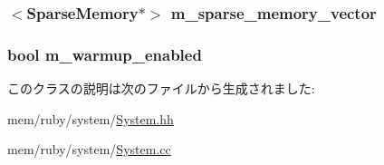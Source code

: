 \label{classRubySystem_aa846ca9467116a26a879dc4b262cf36a}
\hypertarget{classRubySystem_a808eab8032db5c7032a0b805fbb77351}{
\subsubsection[{m\_\-sparse\_\-memory\_\-vector}]{$<${\bf SparseMemory}$\ast$$>$ {\bf m\_\-sparse\_\-memory\_\-vector}}}
\label{classRubySystem_a808eab8032db5c7032a0b805fbb77351}
\hypertarget{classRubySystem_ae9051ba7e9770f4a2be7a20f6f185e86}{
\subsubsection[{m\_\-warmup\_\-enabled}]{\setlength{\rightskip}{0pt plus 5cm}bool {\bf m\_\-warmup\_\-enabled}}}
\label{classRubySystem_ae9051ba7e9770f4a2be7a20f6f185e86}


このクラスの説明は次のファイルから生成されました:\begin{DoxyCompactItemize}
\item 
mem/ruby/system/\hyperlink{System_8hh}{System.hh}\item 
mem/ruby/system/\hyperlink{System_8cc}{System.cc}\end{DoxyCompactItemize}
